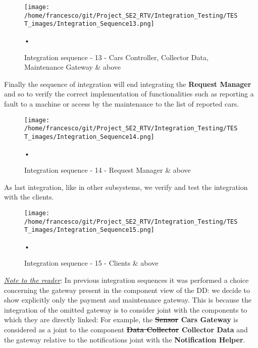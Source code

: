 \documentclass[10pt, a4paper,titlepage]{article}
\begin{document}
\begin{figure}[h]
\begin{center}
\texttt{[image: /home/francesco/git/Project\_SE2\_RTV/Integration\_Testing/TEST\_images/Integration\_Sequence13.png]}
\caption{Integration sequence - 13 - Cars Controller, Collector Data, Maintenance Gateway \& above}
\label{fig:int_seq13}
\end{center}•
\end{figure}
\linebreak
Finally the sequence of integration will end integrating the \textbf{Request Manager} and so to verify the correct implementation of functionalities such as reporting a fault to a machine or access by the maintenance to the list of reported cars.
\begin{figure}[h]
\begin{center}
\texttt{[image: /home/francesco/git/Project\_SE2\_RTV/Integration\_Testing/TEST\_images/Integration\_Sequence14.png]}
\caption{Integration sequence - 14 - Request Manager \& above}
\label{fig:int_seq14}
\end{center}•
\end{figure}
As last integration, like in other subsystems, we verify and test the integration with the clients.
\begin{figure}[h]
\begin{center}
\texttt{[image: /home/francesco/git/Project\_SE2\_RTV/Integration\_Testing/TEST\_images/Integration\_Sequence15.png]}
\caption{Integration sequence - 15 - Clients \& above}
\label{fig:int_seq15}
\end{center}•
\end{figure}
\clearpage
\emph{\underline{Note to the reader}}: In previous integration sequences it was performed a choice concerning the gateway present in the component view of the DD: we decide to show explicitly only the payment and maintenance gateway. This is because the integration of the omitted gateway is to consider joint with the components to which they are directly linked: For example, the \textbf{\sout{Sensor} Cars Gateway} is considered as a joint to the component \textbf{\sout{Data Collector} Collector Data} and the gateway relative to the notifications joint with the \textbf{Notification Helper}.
\pagebreak
\end{document}
